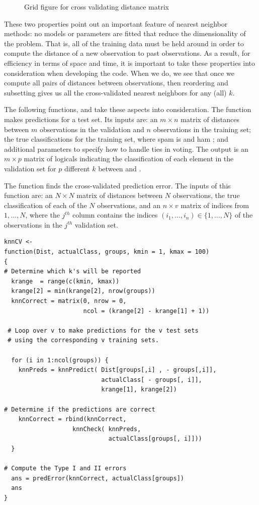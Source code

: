 \begin{figure}
\vspace{2in}
\caption{Grid figure for cross validating distance matrix}
\label{fig:knnCVdiagram}
\end{figure}

These two properties point out an important feature of 
nearest neighbor methods: no models or parameters are fitted  
that reduce the dimensionality of the problem.
That is, all of the training data must be held around in
order to compute the distance of a new observation to past
observations. 
As a result, for efficiency in terms of space and time,
it is important to take these properties into consideration
when developing the code.
When we do, we see that once we compute all pairs of distances 
between observations, then reordering and subsetting gives us 
all the cross-validated nearest neighbors for any (all) $k$.

The following functions,  and
 take these aspects into consideration.  The
 function makes predictions for a test set.
Its inputs are: an $m \times n$ matrix of distances between $m$
observations in the validation and $n$ observations in the training
set; the true classifications for the training set, where spam is
 and ham ; and additional parameters to
specify how to handle ties in voting.  The output is an $m \times p$
matrix of logicals indicating the classification of each element in
the validation set for $p$ different $k$ between  and
.

The function  finds the cross-validated prediction
error.  The inputs of this function are: an $N \times N$ matrix of
distances between $N$ observations, the true classification of each of
the $N$ observations, and an $n \times v$ matrix of indices from $1,
..., N$, where the $j^{th}$ column contains the indices $(i_1, \ldots,
i_n) \in \{1, \ldots , N\}$ of the observations in the $j^{th}$
validation set.

\begin{verbatim}
knnCV <-
function(Dist, actualClass, groups, kmin = 1, kmax = 100)
{
# Determine which k's will be reported
  krange  = range(c(kmin, kmax))
  krange[2] = min(krange[2], nrow(groups))  
  knnCorrect = matrix(0, nrow = 0, 
                      ncol = (krange[2] - krange[1] + 1))

 # Loop over v to make predictions for the v test sets
 # using the corresponding v training sets.

  for (i in 1:ncol(groups)) {
    knnPreds = knnPredict( Dist[groups[,i] , - groups[,i]],
                           actualClass[ - groups[, i]], 
                           krange[1], krange[2])

# Determine if the predictions are correct
    knnCorrect = rbind(knnCorrect, 
                   knnCheck( knnPreds, 
                             actualClass[groups[, i]]))
  }

# Compute the Type I and II errors
  ans = predError(knnCorrect, actualClass[groups])
  ans
}
\end{verbatim}

